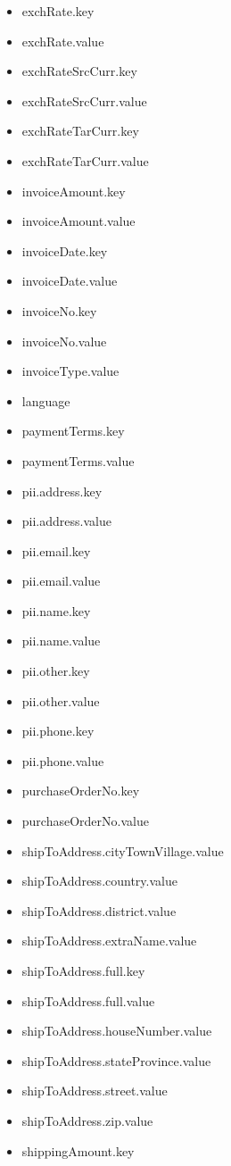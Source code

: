 \begin{multicols}{2}
\begin{itemize}
\item[] exchRate.key
\item[] exchRate.value
\item[] exchRateSrcCurr.key
\item[] exchRateSrcCurr.value
\item[] exchRateTarCurr.key
\item[] exchRateTarCurr.value
\item[] invoiceAmount.key
\item[] invoiceAmount.value
\item[] invoiceDate.key
\item[] invoiceDate.value
\item[] invoiceNo.key
\item[] invoiceNo.value
\item[] invoiceType.value
\item[] language
\item[] paymentTerms.key
\item[] paymentTerms.value
\item[] pii.address.key
\item[] pii.address.value
\item[] pii.email.key
\item[] pii.email.value
\item[] pii.name.key
\item[] pii.name.value
\item[] pii.other.key
\item[] pii.other.value
\item[] pii.phone.key
\item[] pii.phone.value
\item[] purchaseOrderNo.key
\item[] purchaseOrderNo.value
\item[] shipToAddress.cityTownVillage.value
\item[] shipToAddress.country.value
\item[] shipToAddress.district.value
\item[] shipToAddress.extraName.value
\item[] shipToAddress.full.key
\item[] shipToAddress.full.value
\item[] shipToAddress.houseNumber.value
\item[] shipToAddress.stateProvince.value
\item[] shipToAddress.street.value
\item[] shipToAddress.zip.value
\item[] shippingAmount.key

\end{itemize}
\end{multicols}

